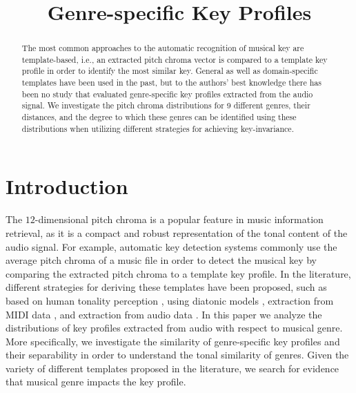 \documentclass{article}
\title{Genre-specific Key Profiles}
\begin{document}
%
\maketitle
%
\begin{abstract}
The most common approaches to the automatic recognition of musical key are template-based, i.e., an extracted pitch chroma vector is compared to a template key profile in order to identify the most similar key. General as well as domain-specific templates have been used in the past, but to the authors' best knowledge there has been no study that evaluated genre-specific key profiles extracted from the audio signal.
We investigate the pitch chroma distributions for 9 different genres, their distances, and the degree to which these genres can be identified using these distributions when utilizing different strategies for achieving key-invariance. 
\end{abstract}
%
\section{Introduction}\label{sec:introduction}
The $12$-dimensional pitch chroma is a popular feature in music information retrieval, as it is a compact and robust representation of the tonal content of the audio signal. For example, automatic key detection systems commonly use the average pitch chroma of a music file in order to detect the musical key by comparing the extracted pitch chroma to a template key profile.  In the literature, different strategies for deriving these templates have been proposed, such as based on human tonality perception \cite{krumhansl_cognitive_1990}, using diatonic models \cite{izmirli_template_2005}, extraction from MIDI data \cite{temperley_pitch-class_2008}, and extraction from audio data \cite{van_de_par_musical_2006}. 
In this paper we analyze the distributions of key profiles extracted from audio with respect to musical genre. More specifically, we investigate the similarity of genre-specific key profiles and their separability in order to understand the tonal similarity of genres. Given the variety of different templates proposed in the literature, we search for evidence that musical genre impacts the key profile.
\end{document}
